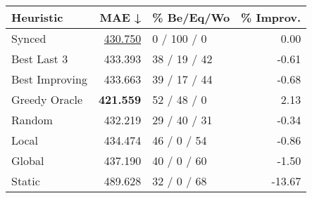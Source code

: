 \begin{tabular}{lrlr}
\toprule
\textbf{Heuristic} & \textbf{MAE ↓} & \textbf{\% Be/Eq/Wo} & \textbf{\% Improv.} \\
\midrule
            Synced &        \underline{430.750} &          0 / 100 / 0 &                0.00 \\
\midrule
       Best Last 3 &        433.393 &         38 / 19 / 42 &               -0.61 \\
    Best Improving &        433.663 &         39 / 17 / 44 &               -0.68 \\
\addlinespace
     Greedy Oracle &        \textbf{421.559} &          52 / 48 / 0 &                2.13 \\
            Random &        432.219 &         29 / 40 / 31 &               -0.34 \\
\midrule
             Local &        434.474 &          46 / 0 / 54 &               -0.86 \\
            Global &        437.190 &          40 / 0 / 60 &               -1.50 \\
\midrule
            Static &        489.628 &          32 / 0 / 68 &              -13.67 \\
\bottomrule
\end{tabular}

\label{tab:iid_lr05_le2_bs2_Summary}
